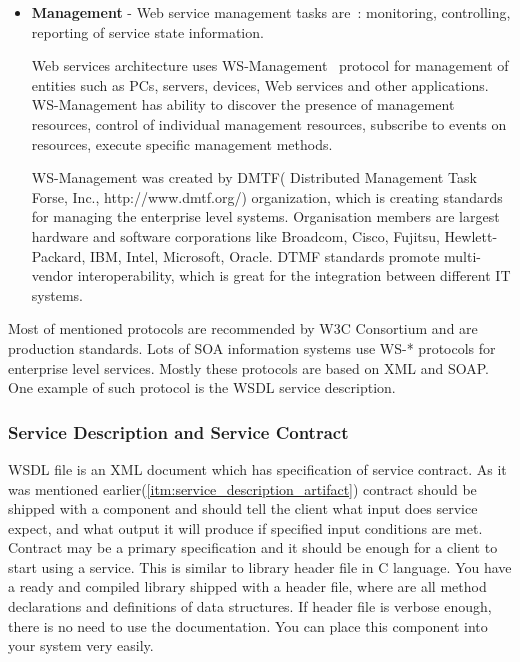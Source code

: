 \begin{itemize}
Web services architecture uses WS-Security\footnote{WS-Security (Web Services
Security, short WSS) is an extension to SOAP to apply security to web services.
It is a member of the WS-* family of web service specifications and was
published by OASIS(Organization for the Advancement of Structured Information
Standards, \url{https://www.oasis-open.org/}). \cite{wikipedia:WS-Security}}
~protocol to solve security problems.
This protocol specifies how SOAP messages may be secured.
 


\item \textbf{Management} -
Web service management tasks are~\cite{ws_arch}: monitoring, controlling,
reporting of service state information. 

Web services architecture uses WS-Management~\cite{ws_security_promo} protocol
for management of entities such as PCs, servers, devices, Web services and other
applications. WS-Management has ability to discover the presence of management resources,
control of individual management resources, subscribe to events on resources,
execute specific management methods.

WS-Management was created by DMTF( Distributed Management Task Forse, Inc.,
http://www.dmtf.org/) organization, which is creating standards for managing
the enterprise level systems. Organisation members are largest hardware and
software corporations like Broadcom, Cisco, Fujitsu, Hewlett-Packard, IBM, Intel,
Microsoft, Oracle. DTMF standards promote multi-vendor interoperability, which
is great for the integration between different IT systems. 

\end{itemize}

Most of mentioned protocols are recommended by W3C Consortium and are production
standards. Lots of SOA information systems use WS-* protocols for
enterprise level services. Mostly these protocols are based on XML and
SOAP. One example of such protocol is the WSDL service description.

\subsubsection{Service Description and Service Contract}
\label{sec:ws_service_contract}
WSDL file is an XML document which has specification of  service contract.
As it was mentioned earlier(\autoref{itm:service_description_artifact}) contract should be shipped with a component and should  tell the
client what input does service expect, and what output it will produce if specified input conditions are met. 
Contract may be a primary specification and it should be enough for a client to start using a service.
This is similar to library header file in C language. 
You have a ready and compiled library shipped with a header file, where are all
method declarations and definitions of data structures.
If header file is verbose enough, there is no need to use the documentation. You can place this component into your system very easily.



